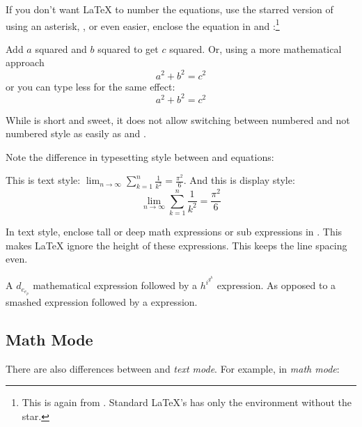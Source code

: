If you don't want \LaTeX{} to number the equations, use the starred
version of  using an asterisk, , or even easier, enclose the
equation in \ci{[} and \ci{]}:\footnote{
  This is again from .
  Standard \LaTeX{}'s has only the  environment without the star.}
\begin{example}
Add $a$ squared and $b$ squared
to get $c$ squared. Or, using
a more mathematical approach
 \begin{equation*}
   a^2 + b^2 = c^2
 \end{equation*}
or you can type less for the
same effect:
 \[ a^2 + b^2 = c^2 \]
\end{example}
While \ci{[} is short and sweet, it does not allow switching between numbered and not numbered style as easily as
 and .

Note the difference in typesetting style between  and 
equations: 
\begin{example}
This is text style: 
$\lim_{n \to \infty} 
 \sum_{k=1}^n \frac{1}{k^2} 
 = \frac{\pi^2}{6}$.
And this is display style:
 \begin{equation}
  \lim_{n \to \infty} 
  \sum_{k=1}^n \frac{1}{k^2} 
  = \frac{\pi^2}{6}
 \end{equation}
\end{example}

In text style, enclose tall or deep math expressions or sub
expressions in . This makes \LaTeX{} ignore the height of
these expressions. This keeps the line spacing even.

\begin{example}
A $d_{e_{e_p}}$ mathematical
expression  followed by a
$h^{i^{g^h}}$ expression. As
opposed to a smashed 
 expression 
followed by a
 expression.
\end{example}

\subsection{Math Mode}

There are also differences between \emph{} and \emph{text mode}. For
example, in \emph{math mode}: 

